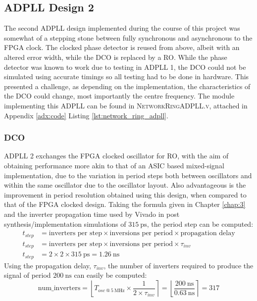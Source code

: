 \subsection{\acs{ADPLL} Design 2}
The second \ac{ADPLL} design implemented during the course of this project was somewhat of a stepping stone between fully synchronous and asynchronous to the \ac{FPGA} clock. The clocked phase detector is reused from above, albeit with an altered error width, while the \ac{DCO} is replaced by a \acl{RO}. While the phase detector was known to work due to testing in \ac{ADPLL} 1, the \ac{DCO} could not be simulated using accurate timings so all testing had to be done in hardware. This presented a challenge, as depending on the implementation, the characteristics of the \ac{DCO} could change, most importantly the centre frequency. The module implementing this \ac{ADPLL} can be found in \textsc{NetworkRingADPLL.v}, attached in Appendix \ref{adx:code} Listing \ref{lst:network_ring_adpll}.

\subsubsection{\acl{DCO}}
\ac{ADPLL} 2 exchanges the \ac{FPGA} clocked oscillator for \ac{RO}, with the aim of obtaining performance more akin to that of an \ac{ASIC} based mixed-signal implementation, due to the variation in period steps both between oscillators and within the same oscillator due to the oscillator layout. Also advantageous is the improvement in period resolution obtained using this design, when compared to that of the \ac{FPGA} clocked design. Taking the formula given in Chapter \ref{chap:3} and the inverter propagation time used by Vivado in post synthesis/implementation simulations of $315~\si{\pico\second}$, the period step can be computed:
\begin{align}
t_{step} &= \text{inverters per step}\times\text{inversions per period}\times\text{propagation delay} \\
t_{step} &= \text{inverters per step}\times\text{inversions per period}\times\tau_{inv} \\
t_{step} &= 2\times 2\times 315~\si{\pico\second} = 1.26~\si{\nano\second}
\end{align}
Using the propagation delay, $\tau_{inv}$, the number of inverters required to produce the signal of period $200~\si{\nano\second}$ can easily be computed:
\begin{equation}
\text{num\_inverters} = \left \lfloor{ T_{osc~@~5~\si{\mega\hertz}}\times \frac{1}{2\times\tau_{inv}}}\right \rceil = \left \lfloor{ \frac{200~\si{\nano\second}}{0.63~\si{\nano\second}}}\right \rceil = 317
\end{equation}

